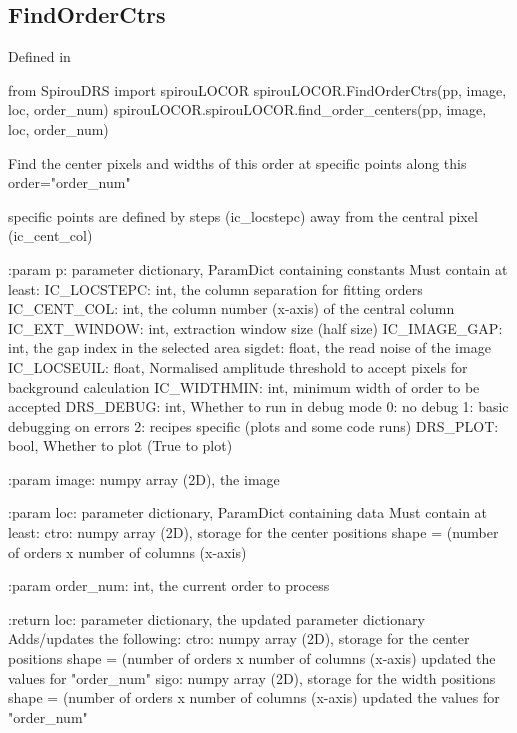 \noindent\begin{minipage}{\textwidth}
\subsection{FindOrderCtrs}

Defined in \spirouLOCOR{}

\begin{pythonbox}
from SpirouDRS import spirouLOCOR
spirouLOCOR.FindOrderCtrs(pp, image, loc, order_num)
spirouLOCOR.spirouLOCOR.find_order_centers(pp, image, loc, order_num)
\end{pythonbox}

\begin{pythondocstring}
Find the center pixels and widths of this order at specific points
along this order="order_num"

specific points are defined by steps (ic_locstepc) away from the
central pixel (ic_cent_col)

:param p: parameter dictionary, ParamDict containing constants
    Must contain at least:
            IC_LOCSTEPC: int, the column separation for fitting orders
            IC_CENT_COL: int, the column number (x-axis) of the central
                         column
            IC_EXT_WINDOW: int, extraction window size (half size)
            IC_IMAGE_GAP: int, the gap index in the selected area
            sigdet: float, the read noise of the image
            IC_LOCSEUIL: float, Normalised amplitude threshold to accept
                         pixels for background calculation
            IC_WIDTHMIN: int, minimum width of order to be accepted
            DRS_DEBUG: int, Whether to run in debug mode
                            0: no debug
                            1: basic debugging on errors
                            2: recipes specific (plots and some code runs)
            DRS_PLOT: bool, Whether to plot (True to plot)

:param image: numpy array (2D), the image

:param loc: parameter dictionary, ParamDict containing data
        Must contain at least:
            ctro: numpy array (2D), storage for the center positions
                  shape = (number of orders x number of columns (x-axis)

:param order_num: int, the current order to process

:return loc: parameter dictionary, the updated parameter dictionary
        Adds/updates the following:
            ctro: numpy array (2D), storage for the center positions
                  shape = (number of orders x number of columns (x-axis)
                  updated the values for "order_num"
            sigo: numpy array (2D), storage for the width positions
                  shape = (number of orders x number of columns (x-axis)
                  updated the values for "order_num"
\end{pythondocstring}
\end{minipage}

